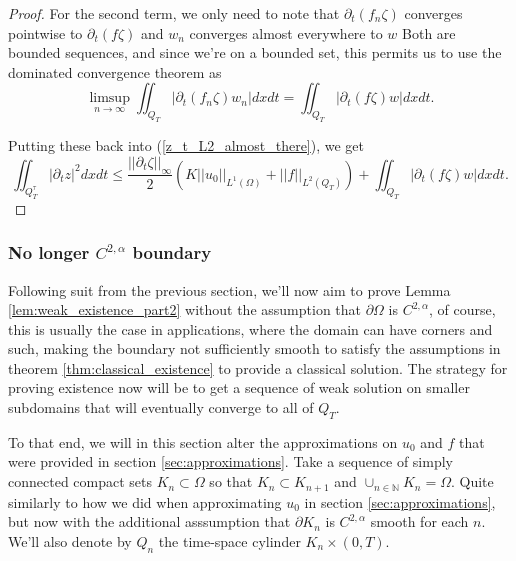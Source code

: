 \documentclass[11pt, a4paper]{article}
\begin{document}
\begin{proof}
For the second term, we only need to note that $\partial_t (f_n \zeta)$ converges pointwise to $\partial_t (f \zeta)$ and $w_n$ converges almost everywhere to $w$ Both are bounded sequences, and since we're on a bounded set, this permits us to use the dominated convergence theorem as
\begin{equation*}
\limsup_{n \to \infty} \iint_{Q_T}|\partial_t (f_n \zeta) w_n| dxdt = \iint_{Q_T}|\partial_t (f \zeta ) w| dxdt.
\end{equation*}

Putting these back into (\ref{z_t_L2_almost_there}), we get
\begin{equation}
\iint_{Q_T^\tau} |\partial_t z|^2 dxdt \leq \frac{||\partial_t \zeta||_\infty}{2}\left( K||u_0||_{L^1(\Omega)} + ||f||_{L^2(Q_T)}\right) +  \iint_{Q_T}|\partial_t (f \zeta ) w| dxdt.
\end{equation}
\end{proof}



\subsubsection{No longer $C^{2,\alpha}$ boundary}
Following suit from the previous section, we'll now aim to prove Lemma \ref{lem:weak_existence_part2} without the assumption that $\partial \Omega$ is $C^{2,\alpha}$, of course, this is usually the case in applications, where the domain can have corners and such, making the boundary not sufficiently smooth to satisfy the assumptions in theorem \ref{thm:classical_existence} to provide a classical solution. The strategy for proving existence now will be to get a sequence of weak solution on smaller subdomains that will eventually converge to all of $Q_T$.

To that end, we will in this section alter the approximations on $u_0$ and $f$ that were provided in section \ref{sec:approximations}. Take a sequence of simply connected compact sets $K_n \subset \Omega$ so that $K_n \subset K_{n+1}$ and $\cup_{n \in \mathbb{N}}K_n = \Omega$. Quite similarly to how we did when approximating $u_0$ in section \ref{sec:approximations}, but now with the additional asssumption that $\partial K_n$ is $C^{2,\alpha}$ smooth for each $n$. We'll also denote by $Q_n$ the time-space cylinder $K_n \times (0,T)$. 
\end{document}
